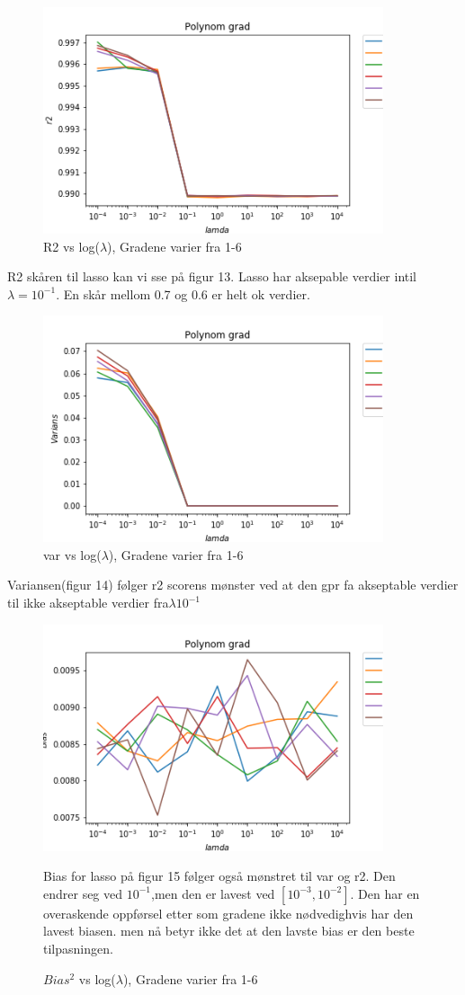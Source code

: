 \documentclass[norsk,a4paper,12pt]{article}
\begin{document}
\begin{figure}[H]
\includegraphics[width=100mm]{r2(L)}
\caption{R2 vs log($\lambda$), Gradene varier fra 1-6}
\end{figure}
R2 skåren til lasso kan vi sse på figur 13. Lasso har aksepable verdier intil $\lambda = 10^{-1}$. En skår mellom 0.7 og 0.6 er helt ok verdier.
\begin{figure}[H]
\includegraphics[width=100mm]{var(L)}
\caption{var vs log($\lambda$), Gradene varier fra 1-6 }
\end{figure}
Variansen(figur 14) følger r2 scorens mønster ved at den gpr fa akseptable verdier til ikke akseptable verdier fra$\lambda 10^{-1}$
\begin{figure}[H]
\includegraphics[width=100mm]{Bias(L)}
\caption{$Bias^2$ vs log($\lambda$), Gradene varier fra 1-6 }
Bias for lasso på figur 15 følger også mønstret til var og r2. Den endrer seg ved $10^{-1}$,men den er lavest ved $[10^{-3},10^{-2}]$. Den har en overaskende oppførsel etter som gradene ikke nødvedighvis har den lavest biasen. men nå betyr ikke det at den lavste bias er den beste tilpasningen.
\end{figure}
\end{document}
